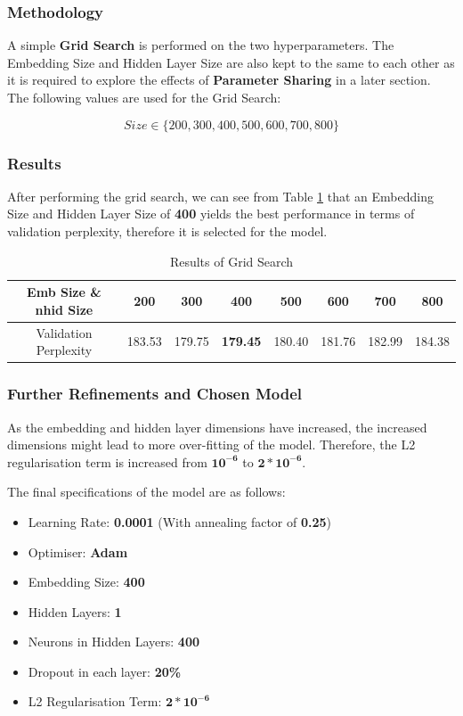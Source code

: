 \documentclass[sigconf,nonacm=true]{acmart}
\begin{document}
\subsubsection{Methodology}
A simple \textbf{Grid Search} is performed on the two hyperparameters. The Embedding Size and Hidden Layer Size are also kept to the same to each other as it is required to explore the effects of \textbf{Parameter Sharing} in a later section. The following values are used for the Grid Search:

\begin{displaymath}
Size \in \{200, 300, 400, 500, 600, 700, 800\}
\end{displaymath}
\subsubsection{Results} 
After performing the grid search, we can see from Table \ref{tab:gridsearch} that an Embedding Size and Hidden Layer Size of \textbf{400} yields the best performance in terms of validation perplexity, therefore it is selected for the model.
\begin{table}[H]
	\label{tab:gridsearch}
	\begin{adjustbox}{width=\columnwidth}
		\begin{tabular}{cccccccc}
			\toprule
			Emb Size \& nhid Size & 200 & 300 & \textbf{400} & 500 & 600 & 700 & 800 \\
			\midrule
			Validation Perplexity& 183.53 & 179.75 & \textbf{179.45} & 180.40 & 181.76 & 182.99 & 184.38 \\
			\bottomrule
		\end{tabular}
	\end{adjustbox}
	\caption{Results of Grid Search}
\end{table}

\subsubsection{Further Refinements and Chosen Model}
\label{subsubsection:chosenmodel}
As the embedding and hidden layer dimensions have increased, the increased dimensions might lead to more over-fitting of the model. Therefore, the L2 regularisation term is increased from \(\mathbf{10^{-6}}\) to \(\mathbf{2 * 10^{-6}}\). 

The final specifications of the model are as follows:

\begin{itemize}
	\item Learning Rate: \textbf{0.0001} (With annealing factor of \textbf{0.25})
	\item Optimiser: \textbf{Adam}
	\item Embedding Size: \textbf{400}
	\item Hidden Layers: \textbf{1}
	\item Neurons in Hidden Layers: \textbf{400}
	\item Dropout in each layer: \textbf{20\%}
	\item L2 Regularisation Term: \(\mathbf{2 * 10^{-6}}\)

\end{itemize}
\end{document}
